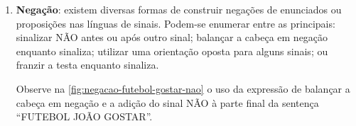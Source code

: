 \begin{enumerate}
\begin{enumerate}
                    {capitulos/fundamentacao/imagens/topicalizada_futebol_gostar} %
                    {height=3cm} %
                    {Frase topicalizada ``FUTEBOL JOÃO GOSTAR''} %
                    {quadros-2004-estudos-linguisticos} %


          \end{enumerate}


    \item \textbf{Negação}: existem diversas formas de construir negações de enunciados ou proposições nas línguas de sinais. Podem-se enumerar entre as principais: sinalizar NÃO antes ou após outro sinal; balançar a cabeça em negação enquanto sinaliza; utilizar uma orientação oposta para alguns sinais; ou franzir a testa enquanto sinaliza.

          Observe na \autoref{fig:negacao-futebol-gostar-nao} o uso da expressão de balançar a cabeça em negação e a adição do sinal NÃO à parte final da sentença ``FUTEBOL JOÃO GOSTAR''.





\end{enumerate}

